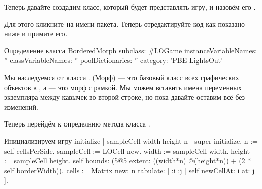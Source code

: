 \documentclass[a4paper,10pt,twoside]{book}
\begin{document}
{%
Теперь давайте создадим класс, который будет представлять игру, и назовём его .

Для этого кликните на имени пакета.
Теперь отредактируйте код как показано ниже и примите его.

\begin{classdef}[sbegame]{Определение класса }
BorderedMorph subclass: #LOGame
   instanceVariableNames: ''
   classVariableNames: ''
   poolDictionaries: ''
   category: 'PBE-LightsOut'
\end{classdef}

Мы наследуемся от класса .  (Морф) --- это базовый класс всех графических объектов в \pharo, а  --- это морф с рамкой.
Мы можем вставить имена переменных экземпляра между кавычек во второй строке, но пока давайте оставим всё без изменений.

Теперь перейдём к определнию метода  класса .


\begin{numMethod}[sbegameinitialize]{Инициализируем игру}
initialize
   | sampleCell width height n |
   super initialize.
   n := self cellsPerSide.
   sampleCell := LOCell new.
   width := sampleCell width.
   height := sampleCell height.
   self bounds: (5@5 extent: ((width*n) @(height*n)) + (2 * self borderWidth)).
   cells := Matrix new: n tabulate: [ :i :j | self newCellAt: i at: j ].
\end{numMethod}

}
\end{document}
